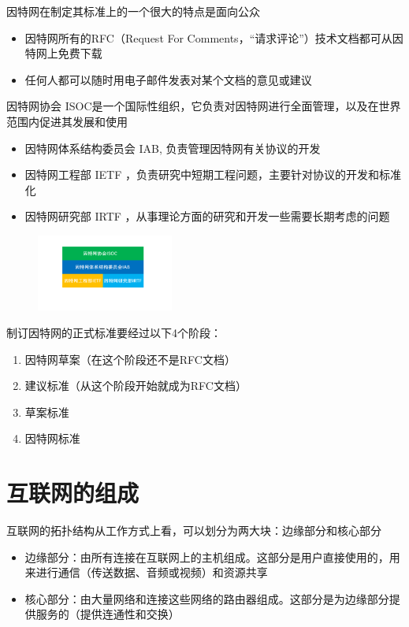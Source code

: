 \documentclass[cs4size,a4paper,10pt]{ctexart}
\begin{document}
	因特网在制定其标准上的一个很大的特点是面向公众
	\begin{itemize}
		\item 因特网所有的RFC（Request For Comments，“请求评论”）技术文档都可从因特网上免费下载
		\item 任何人都可以随时用电子邮件发表对某个文档的意见或建议
	\end{itemize}

	因特网协会 ISOC是一个国际性组织，它负责对因特网进行全面管理，以及在世界范围内促进其发展和使用
	\begin{itemize}
		\item 因特网体系结构委员会 IAB, 负责管理因特网有关协议的开发
		\item 因特网工程部 IETF ，负责研究中短期工程问题，主要针对协议的开发和标准化
		\item 因特网研究部 IRTF ，从事理论方面的研究和开发一些需要长期考虑的问题
	\end{itemize}

	\begin{figure}[H]
		\centering
		\includegraphics[width=0.4\textwidth]{img/1.2.3}
	\end{figure}
	
	制订因特网的正式标准要经过以下4个阶段：
	\begin{enumerate}[label=\arabic*.]
		\item 因特网草案（在这个阶段还不是RFC文档）
		\item 建议标准（从这个阶段开始就成为RFC文档）
		\item 草案标准
		\item 因特网标准
	\end{enumerate}

	\section{互联网的组成}
	互联网的拓扑结构从工作方式上看，可以划分为两大块：边缘部分和核心部分
	\begin{itemize}
		\item 边缘部分：由所有连接在互联网上的主机组成。这部分是用户直接使用的，用来进行通信（传送数据、音频或视频）和资源共享
		\item 核心部分：由大量网络和连接这些网络的路由器组成。这部分是为边缘部分提供服务的（提供连通性和交换）
	\end{itemize}
\end{document}
